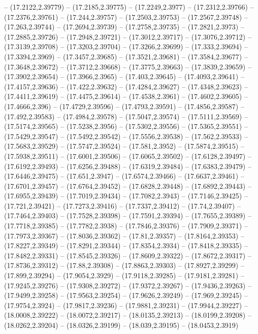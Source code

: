 {-- (17.2122,2.39779) -- (17.2185,2.39775) -- (17.2249,2.3977) -- (17.2312,2.39766) -- (17.2376,2.39761) -- (17.244,2.39757) -- (17.2503,2.39753) -- (17.2567,2.39748) -- (17.263,2.39744) -- (17.2694,2.39739) -- (17.2758,2.39735) -- (17.2821,2.3973)
-- (17.2885,2.39726) -- (17.2948,2.39721) -- (17.3012,2.39717) -- (17.3076,2.39712) -- (17.3139,2.39708) -- (17.3203,2.39704) -- (17.3266,2.39699) -- (17.333,2.39694) -- (17.3394,2.3969) -- (17.3457,2.39685) -- (17.3521,2.39681) -- (17.3584,2.39677)
-- (17.3648,2.39672) -- (17.3712,2.39668) -- (17.3775,2.39663) -- (17.3839,2.39659) -- (17.3902,2.39654) -- (17.3966,2.3965) -- (17.403,2.39645) -- (17.4093,2.39641) -- (17.4157,2.39636) -- (17.422,2.39632) -- (17.4284,2.39627) -- (17.4348,2.39623)
-- (17.4411,2.39619) -- (17.4475,2.39614) -- (17.4538,2.3961) -- (17.4602,2.39605) -- (17.4666,2.396) -- (17.4729,2.39596) -- (17.4793,2.39591) -- (17.4856,2.39587) -- (17.492,2.39583) -- (17.4984,2.39578) -- (17.5047,2.39574) -- (17.5111,2.39569)
-- (17.5174,2.39565) -- (17.5238,2.3956) -- (17.5302,2.39556) -- (17.5365,2.39551) -- (17.5429,2.39547) -- (17.5492,2.39542) -- (17.5556,2.39538) -- (17.562,2.39533) -- (17.5683,2.39529) -- (17.5747,2.39524) -- (17.581,2.3952) -- (17.5874,2.39515)
-- (17.5938,2.39511) -- (17.6001,2.39506) -- (17.6065,2.39502) -- (17.6128,2.39497) -- (17.6192,2.39493) -- (17.6256,2.39488) -- (17.6319,2.39484) -- (17.6383,2.39479) -- (17.6446,2.39475) -- (17.651,2.3947) -- (17.6574,2.39466) -- (17.6637,2.39461)
-- (17.6701,2.39457) -- (17.6764,2.39452) -- (17.6828,2.39448) -- (17.6892,2.39443) -- (17.6955,2.39439) -- (17.7019,2.39434) -- (17.7082,2.3943) -- (17.7146,2.39425) -- (17.721,2.39421) -- (17.7273,2.39416) -- (17.7337,2.39412) -- (17.74,2.39407)
-- (17.7464,2.39403) -- (17.7528,2.39398) -- (17.7591,2.39394) -- (17.7655,2.39389) -- (17.7718,2.39385) -- (17.7782,2.3938) -- (17.7846,2.39376) -- (17.7909,2.39371) -- (17.7973,2.39367) -- (17.8036,2.39362) -- (17.81,2.39357) -- (17.8164,2.39353)
-- (17.8227,2.39349) -- (17.8291,2.39344) -- (17.8354,2.3934) -- (17.8418,2.39335) -- (17.8482,2.39331) -- (17.8545,2.39326) -- (17.8609,2.39322) -- (17.8672,2.39317) -- (17.8736,2.39312) -- (17.88,2.39308) -- (17.8863,2.39303) -- (17.8927,2.39299)
-- (17.899,2.39294) -- (17.9054,2.3929) -- (17.9118,2.39285) -- (17.9181,2.39281) -- (17.9245,2.39276) -- (17.9308,2.39272) -- (17.9372,2.39267) -- (17.9436,2.39263) -- (17.9499,2.39258) -- (17.9563,2.39254) -- (17.9626,2.39249) -- (17.969,2.39245)
-- (17.9754,2.3924) -- (17.9817,2.39236) -- (17.9881,2.39231) -- (17.9944,2.39227) -- (18.0008,2.39222) -- (18.0072,2.39217) -- (18.0135,2.39213) -- (18.0199,2.39208) -- (18.0262,2.39204) -- (18.0326,2.39199) -- (18.039,2.39195) -- (18.0453,2.3919)
}
